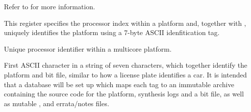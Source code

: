 Refer to  for more information.

\implementation{}

\implementation{}

\implementation{}

\implementation{}


This register specifies the processor index within a platform and, together with
, uniquely identifies the platform using a 7-byte ASCII
idenfitication tag.

\reset{********}
Unique processor identifier within a multicore platform.

\implementation{}

First ASCII character in a string of seven characters, which together identify 
the platform and bit file, similar to how a license plate identifies a car. It 
is intended that a database will be set up which maps each tag to an immutable 
archive containing the source code for the platform, synthesis logs and a bit 
file, as well as mutable ,  and errata/notes 
files.

\implementation{}

\implementation{}

